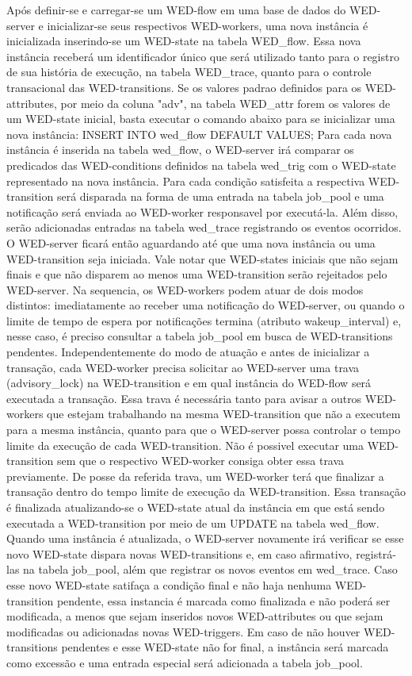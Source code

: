   Após definir-se e carregar-se um WED-flow em uma base de dados do WED-server e inicializar-se seus respectivos WED-workers, uma
nova instância é inicializada inserindo-se um WED-state na tabela WED_flow. Essa nova instância receberá um identificador
único que será utilizado tanto para o registro de sua história de execução, na tabela WED_trace, quanto para o controle
transacional das WED-transitions. Se os valores padrao definidos para os WED-attributes, por meio da coluna "adv", na 
tabela WED_attr forem os valores de um WED-state inicial, basta executar o comando abaixo para se inicializar uma nova
instância:
  INSERT INTO wed_flow DEFAULT VALUES;
  Para cada nova instância é inserida na tabela wed_flow, o WED-server irá comparar os predicados das WED-conditions definidos
na tabela wed_trig com o WED-state representado na nova instância. Para cada condição satisfeita a respectiva WED-transition
será disparada na forma de uma entrada na tabela job_pool e uma notificação será enviada ao WED-worker responsavel
por executá-la. Além disso, serão adicionadas entradas na tabela wed_trace registrando os eventos ocorridos. O WED-server
ficará então aguardando até que uma nova instância ou uma WED-transition seja iniciada. Vale notar que WED-states iniciais 
que não sejam finais e que não disparem ao menos uma WED-transition serão rejeitados pelo WED-server.
  Na sequencia, os WED-workers podem atuar de dois modos distintos: imediatamente ao receber uma notificação do WED-server, ou quando o limite
de tempo de espera por notificações termina (atributo wakeup_interval) e, nesse caso, é preciso consultar a tabela job_pool em
busca de WED-transitions pendentes. Independentemente do modo de atuação e antes de inicializar a transação, cada WED-worker 
precisa solicitar ao WED-server uma trava (advisory_lock) na WED-transition e em qual instância do WED-flow será executada a transação. 
Essa trava é necessária tanto para avisar a outros WED-workers que estejam trabalhando na mesma WED-transition que não a 
executem para a mesma instância, quanto para que o WED-server possa controlar o tempo limite da execução de cada WED-transition. 
Não é possivel executar uma WED-transition sem que o respectivo WED-worker consiga obter essa trava previamente.
  De posse da referida trava, um WED-worker terá que finalizar a transação dentro do tempo limite de execução da WED-transition.
Essa transação é finalizada atualizando-se o WED-state atual da instância em que está sendo executada a WED-transition por meio
de um UPDATE na tabela wed_flow.
  Quando uma instância é atualizada, o WED-server novamente irá verificar se esse novo WED-state dispara novas WED-transitions
e, em caso afirmativo, registrá-las na tabela job_pool, além que registrar os novos eventos em wed_trace. Caso esse novo WED-state
satifaça a condição final e não haja nenhuma WED-transition pendente, essa instancia é marcada como finalizada e não poderá ser
modificada, a menos que sejam inseridos novos WED-attributes ou que sejam modificadas ou adicionadas novas WED-triggers. Em
caso de não houver WED-transitions pendentes e esse WED-state não for final, a instância será marcada como excessão e uma
entrada especial será adicionada a tabela job_pool.

